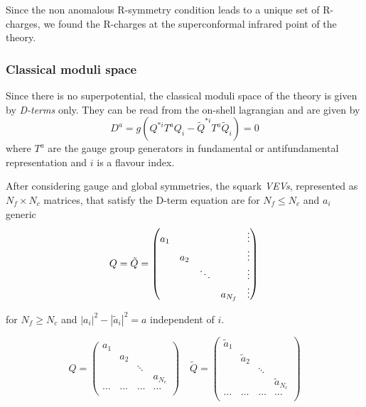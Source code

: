 Since the non anomalous R-symmetry condition leads to a unique set of R-charges, we found the R-charges at the superconformal infrared point of the theory.


\subsubsection{Classical moduli space}
Since there is no superpotential, the classical moduli space of the theory is given by \emph{D-terms} only. 
They can be read from the on-shell lagrangian and are given by
\begin{equation}
 D^a = g \left( Q^{*i} T^a Q_i - \tilde{Q}^{* i} T^a \tilde{Q}_i \right) = 0
\end{equation}
where $T^a$ are the gauge group generators in fundamental or antifundamental representation and $i$ is a flavour index.

After considering gauge and global symmetries, the squark \emph{VEVs}, represented as $N_f \times N_c$ matrices, that satisfy the D-term equation are for  $N_f \le N_c$ and $a_i$ generic
\begin{equation}
Q = \tilde{Q} = 
\begin{pmatrix}
 a_1 & 		&	 &	 & \vdots \\
	 & a_2  & 	 & 	 & \vdots \\  	
 	 & 		&	\ddots &	 &\vdots  \\
	 &  & 	 & 	a_{N_f}  & \vdots
\end{pmatrix} 
 \\
\end{equation}

for $N_f \geq N_c$ and $ | a_i|^2 - | \tilde{a}_i |^2 = a $ independent of $i$.

\begin{equation}
Q  = 
\begin{pmatrix} 
	 a_1 & 		&	 &	  \\
	 & a_2  & 	 & 	 \\  	
 	 & 		&	\ddots &	   \\
	 &  & 	 & 	a_{N_c}  \\
	 \dots & \dots & \dots & \dots\\ 
\end{pmatrix} 
\quad
\tilde{Q} = 
\begin{pmatrix}
 \tilde{a}_1 & 		&	 &	  \\
	 & \tilde{a}_2  & 	 & 	 \\  	
 	 & 		&	\ddots &	   \\
	 &  & 	 & 	\tilde{a}_{N_c}  \\
	 \dots & \dots & \dots & \dots\\ 
\end{pmatrix} 
\end{equation}



